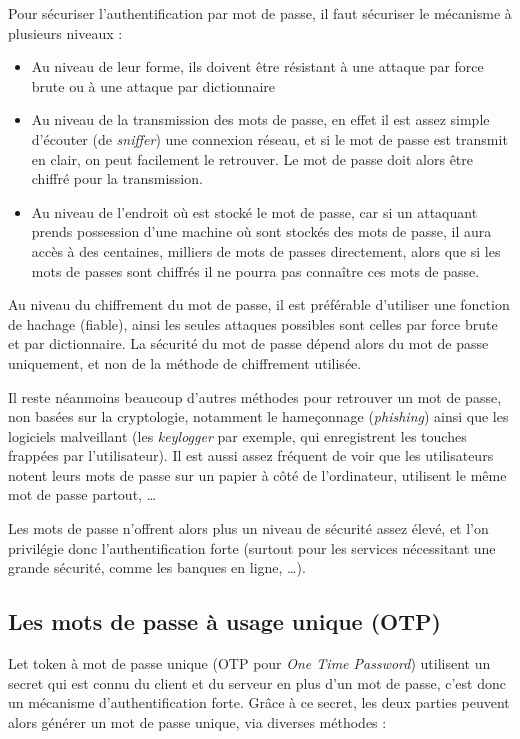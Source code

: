 Pour sécuriser l'authentification par mot de passe, il faut
sécuriser le mécanisme à plusieurs niveaux :
\begin{itemize}
  \item Au niveau de leur forme, ils doivent
être résistant à une attaque par force brute ou à une attaque 
par dictionnaire
  \item Au niveau de la transmission des mots de passe, en effet
il est assez simple d'écouter (de \emph{sniffer}) une connexion
réseau, et si le mot de passe est transmit en clair, on peut
facilement le retrouver. Le mot de passe doit alors être chiffré
pour la transmission.
  \item Au niveau de l'endroit où est stocké le mot de passe, car
si un attaquant prends possession d'une machine où sont stockés
des mots de passe, il aura accès à des centaines, milliers de mots
de passes directement, alors que si les mots de passes sont
chiffrés il ne pourra pas connaître ces mots de passe.
\end{itemize}

Au niveau du chiffrement du mot de passe, il est préférable
d'utiliser une fonction de hachage (fiable), ainsi les seules
attaques possibles sont celles par force brute et par
dictionnaire. La sécurité du mot de passe dépend alors du mot de
passe uniquement, et non de la méthode de chiffrement utilisée.

Il reste néanmoins beaucoup d'autres méthodes pour retrouver un mot de
passe, non basées sur la cryptologie, notamment le hameçonnage
(\emph{phishing}) ainsi que les logiciels malveillant (les
\emph{keylogger} par exemple, qui enregistrent les touches
frappées par l'utilisateur). Il est aussi assez fréquent de voir
que les utilisateurs notent leurs mots de passe sur un papier à
côté de l'ordinateur, utilisent le même mot de passe partout, …

Les mots de passe n'offrent alors plus un niveau de sécurité assez
élevé, et l'on privilégie donc l'authentification forte (surtout
pour les services nécessitant une grande sécurité, comme les
banques en ligne, …).

\subsection{Les mots de passe à usage unique (OTP)}
Let token à mot de passe unique (OTP pour \emph{One Time
Password}) utilisent un secret qui est connu du client et du
serveur en plus d'un mot de passe, c'est donc un mécanisme
d'authentification forte.
Grâce à ce secret, les deux parties peuvent alors générer
un mot de passe unique, via diverses méthodes : 

